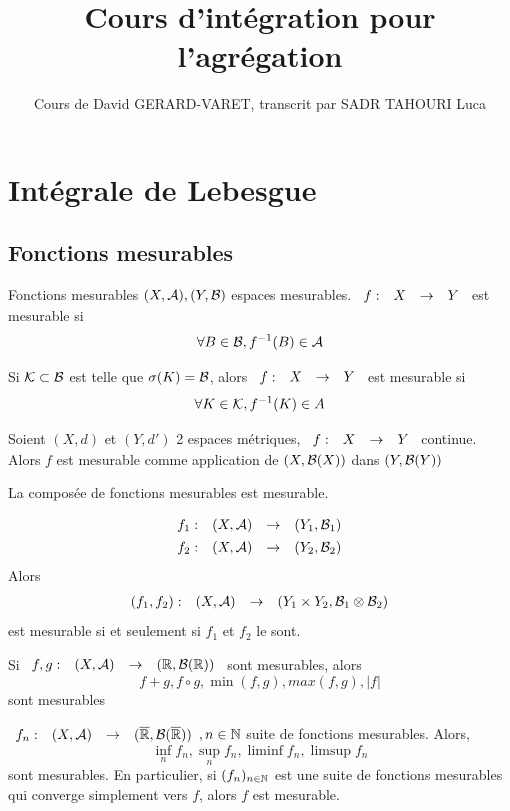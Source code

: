 \documentclass[]{report}
\title{Cours d'intégration pour l'agrégation}
\author{Cours de David GERARD-VARET, transcrit par SADR TAHOURI Luca}
\date{}
\begin{document}
    \maketitle
    \tableofcontents

\chapter{Intégrale de Lebesgue}

\section{Fonctions mesurables}

\begin{df}{Fonctions mesurables}{}
    $(X,\mathcal{A}),(Y,\mathcal{B})$ espaces mesurables. $\begin{array}{ccccc} f : & X & \to & Y \end{array}$ est mesurable si
    \[\forall B\in \mathcal{B},f^{-1}(B)\in \mathcal{A}\]
\end{df}

\begin{prop}{}{}
    Si $\mathcal{K}\subset \mathcal{B}$ est telle que $\sigma(K)=\mathcal{B}$, alors $\begin{array}{ccccc} f : & X & \to & Y \end{array}$ est mesurable si
    \[\forall K\in \mathcal{K},f^{-1}(K)\in A\]
\end{prop}

\begin{prop}{}{}
    Soient $(X,d)$ et $(Y,d')$ 2 espaces métriques, $\begin{array}{ccccc} f : & X & \to & Y \end{array}$ continue. Alors $f$ est mesurable comme application de $(X,\mathcal{B}(X))$ dans $(Y,\mathcal{B}(Y))$
\end{prop}

\begin{lm}{}{}
    La composée de fonctions mesurables est mesurable.
\end{lm}

\begin{lm}{}{}
    \begin{align*}
        \begin{array}{ccccc} f_1 : & (X,\mathcal{A}) & \to & (Y_1,\mathcal{B}_1) \end{array}\\
        \begin{array}{ccccc} f_2 : & (X,\mathcal{A}) & \to & (Y_2,\mathcal{B}_2) \end{array}
    \end{align*}
    Alors
    \[\begin{array}{ccccc} (f_1,f_2) : & (X,\mathcal{A}) & \to & (Y_1\times Y_2,\mathcal{B}_1\otimes \mathcal{B}_2) \end{array}\]
    est mesurable si et seulement si $f_1$ et $f_2$ le sont.
\end{lm}

\begin{cor}{}{}
    Si $\begin{array}{ccccc} f,g : & (X,\mathcal{A}) & \to & (\mathbb{R},\mathcal{B}(\mathbb{R})) \end{array}$ sont mesurables, alors
    \[f+g,f\circ g, \min (f,g), max (f,g),\left|f\right|\]
    sont mesurables
\end{cor}

\begin{prop}{}{}
    $\begin{array}{ccccc} f_n : & (X,\mathcal{A}) & \to & (\overline{\mathbb{R}},\mathcal{B}(\overline{\mathbb{R}})) \end{array},n\in \mathbb{N}$ suite de fonctions mesurables. Alors,
    \[\inf_n f_n, \sup_n f_n, \liminf f_n, \limsup f_n\]
    sont mesurables. En particulier, si $(f_n)_{n\in\mathbb{N}}$ est une suite de fonctions mesurables qui converge simplement vers $f$, alors $f$ est mesurable.
\end{prop}
\end{document}
